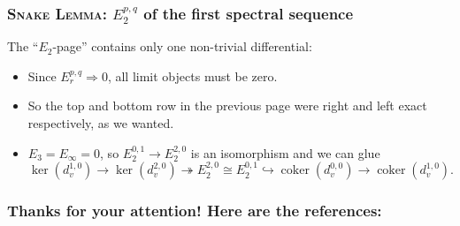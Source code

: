 \documentclass[notheorems]{beamer}
\theoremstyle{plain}
\theoremstyle{definition}
\theoremstyle{darkredexample}
\theoremstyle{remark}
\DeclareMathOperator{\coker}{coker}
\begin{document}
\begin{frame}
    \frametitle{\textsc{Snake Lemma}: $E_{2}^{p,q}$ of the first spectral sequence}
    The ``$E_{2}$-page'' contains only one non-trivial differential:
    \pause
    \begin{itemize}
	\item Since $E_{r}^{p,q}\Rightarrow 0$, all limit objects must be zero.
	    \pause
	\item So the top and bottom row in the previous page were right and left exact respectively, as we wanted.
	    \pause
	\item $E_{3}=E_{\infty}=0$, so $E_{2}^{0,1}\to E_{2}^{2,0}$ is an isomorphism and we can glue
	    \[ \ker(d_{v}^{1,0})\to \ker(d_{v}^{2,0})\twoheadrightarrow E_{2}^{2,0}\cong E_{2}^{0,1}\hookrightarrow \coker(d_{v}^{0,0})\to \coker(d_{v}^{1,0}). \]
    \end{itemize}
\end{frame}

\begin{frame}
    \frametitle{Thanks for your attention! Here are the references:}
    
    
\end{frame}
 
\end{document}
